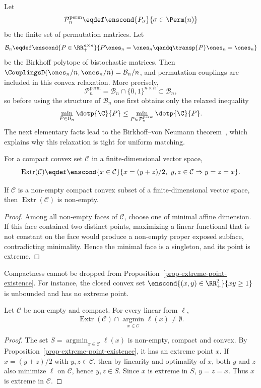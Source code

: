 Let
\[
	\mathcal P_n^{\mathrm{perm}}
	\eqdef
	\enscond{P_\sigma}{\sigma\in\Perm(n)}
\]
be the finite set of permutation matrices.
Let
\[
	\mathcal B_n
	\eqdef
	\enscond{P\in\RR_+^{n\times n}}{P\ones_n=\ones_n \qandq \transp{P}\ones_n=\ones_n}
\]
be the Birkhoff polytope of bistochastic matrices. Then $\CouplingsD(\ones_n/n,\ones_n/n)=\mathcal B_n/n$, and permutation couplings are included in this convex relaxation. More precisely,
\[
	\mathcal P_n^{\mathrm{perm}}
	=
	\mathcal B_n\cap\{0,1\}^{n\times n}
	\subset
	\mathcal B_n,
\]
so before using the structure of $\mathcal B_n$ one first obtains only the relaxed inequality
\[
	\min_{P\in\mathcal B_n}\dotp{\C}{P}
	\leq
	\min_{P\in\mathcal P_n^{\mathrm{perm}}}\dotp{\C}{P}.
\]
The next elementary facts lead to the Birkhoff--von Neumann theorem~\cite{birkhoff}, which explains why this relaxation is tight for uniform matching.

\begin{defn}\label{def-extreme-points}
	For a compact convex set $\mathcal C$ in a finite-dimensional vector space,
	\[
		\operatorname{Extr}(\mathcal C)
		\eqdef
		\enscond{x\in\mathcal C}{x=(y+z)/2,\ y,z\in\mathcal C \Rightarrow y=z=x}.
	\]
\end{defn}

\begin{prop}\label{prop-extreme-point-existence}
	If $\mathcal C$ is a non-empty compact convex subset of a finite-dimensional vector space, then $\operatorname{Extr}(\mathcal C)$ is non-empty.
\end{prop}
\begin{proof}
	Among all non-empty faces of $\mathcal C$, choose one of minimal affine dimension. If this face contained two distinct points, maximizing a linear functional that is not constant on the face would produce a non-empty proper exposed subface, contradicting minimality. Hence the minimal face is a singleton, and its point is extreme.
\end{proof}

\begin{rem}
	Compactness cannot be dropped from Proposition~\ref{prop-extreme-point-existence}. For instance, the closed convex set $\enscond{(x,y)\in\RR_+^2}{xy\geq1}$ is unbounded and has no extreme point.
\end{rem}

\begin{prop}\label{prop-linear-program-extreme-minimizer}
	Let $\mathcal C$ be non-empty and compact. For every linear form $\ell$,
	\[
		\operatorname{Extr}(\mathcal C)\cap\operatorname*{argmin}_{x\in\mathcal C}\ell(x)
		\neq\emptyset.
	\]
\end{prop}
\begin{proof}
	The set $S=\operatorname*{argmin}_{x\in\mathcal C}\ell(x)$ is non-empty, compact and convex. By Proposition~\ref{prop-extreme-point-existence}, it has an extreme point $x$. If $x=(y+z)/2$ with $y,z\in\mathcal C$, then by linearity and optimality of $x$, both $y$ and $z$ also minimize $\ell$ on $\mathcal C$, hence $y,z\in S$. Since $x$ is extreme in $S$, $y=z=x$. Thus $x$ is extreme in $\mathcal C$.
\end{proof}

